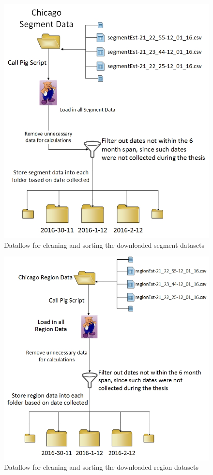\documentclass[titlepage,twocolumn]{article}
\begin{document}
\begin{figure}[H]
	\centering
	\includegraphics[scale=.4]{segmentFlow.jpg}
	\caption{\small Dataflow for cleaning and sorting the downloaded segment datasets}
	\label{fig:SegmentDataProcessing}
\end{figure}

\begin{figure}[H]
	\centering
	\includegraphics[scale=.4]{regionFlow.jpg}
	\caption{\small Dataflow for cleaning and sorting the downloaded region datasets}
	\label{fig:RegionDataProcessing}
\end{figure}
\end{document}
